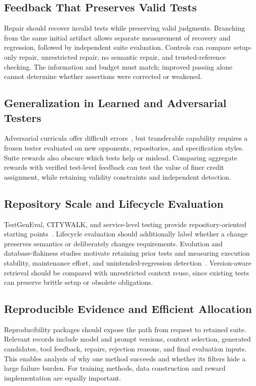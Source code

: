 \subsection{Feedback That Preserves Valid Tests}
Repair should recover invalid tests while preserving valid judgments. Branching from the same initial artifact allows separate measurement of recovery and regression, followed by independent suite evaluation. Controls can compare setup-only repair, unrestricted repair, no semantic repair, and trusted-reference checking. The information and budget must match; improved passing alone cannot determine whether assertions were corrected or weakened.

\subsection{Generalization in Learned and Adversarial Testers}
Adversarial curricula offer difficult errors~\cite{T02,T03,T07}, but transferable capability requires a frozen tester evaluated on new opponents, repositories, and specification styles. Suite rewards also obscure which tests help or mislead. Comparing aggregate rewards with verified test-level feedback can test the value of finer credit assignment, while retaining validity constraints and independent detection.

\subsection{Repository Scale and Lifecycle Evaluation}
TestGenEval, CITYWALK, and service-level testing provide repository-oriented starting points~\cite{B01,U08,A02}. Lifecycle evaluation should additionally label whether a change preserves semantics or deliberately changes requirements. Evolution and database-flakiness studies motivate retaining prior tests and measuring execution stability, maintenance effort, and unintended-regression detection~\cite{E02,E03}. Version-aware retrieval should be compared with unrestricted context reuse, since existing tests can preserve brittle setup or obsolete obligations.

\subsection{Reproducible Evidence and Efficient Allocation}
Reproducibility packages should expose the path from request to retained suite. Relevant records include model and prompt versions, context selection, generated candidates, tool feedback, repairs, rejection reasons, and final evaluation inputs. This enables analysis of why one method succeeds and whether its filters hide a large failure burden. For training methods, data construction and reward implementation are equally important.

